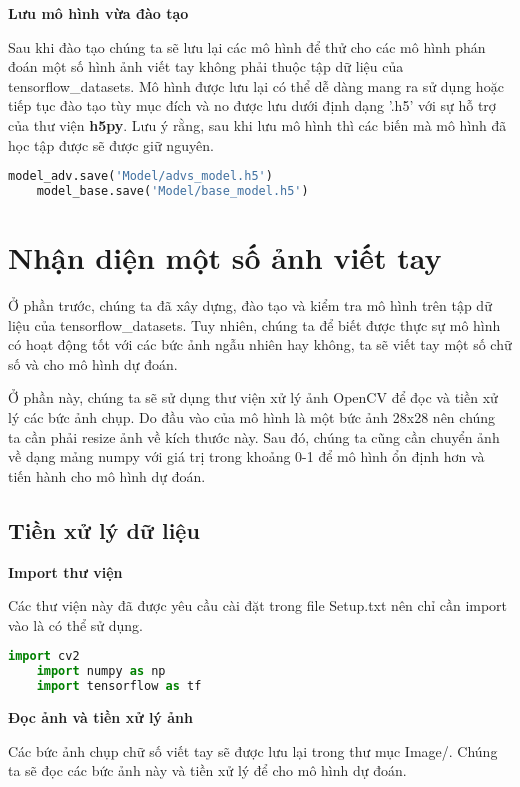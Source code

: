 \textbf{Lưu mô hình vừa đào tạo}

Sau khi đào tạo chúng ta sẽ lưu lại các mô hình để thử cho các mô hình phán đoán một số hình ảnh viết tay không phải thuộc tập dữ
liệu của tensorflow\_datasets. Mô hình được lưu lại có thể dễ dàng mang ra sử dụng hoặc tiếp tục đào tạo tùy mục đích và no được lưu dưới định dạng '.h5' với sự hỗ trợ của
thư viện \textbf{h5py}. Lưu ý rằng, sau khi lưu mô hình thì các biến mà mô hình đã học tập được sẽ được giữ nguyên.

\begin{lstlisting}[language = Python]
    model_adv.save('Model/advs_model.h5')
    model_base.save('Model/base_model.h5')
\end{lstlisting}

\cite*{WEBSITE}

\section{Nhận diện một số ảnh viết tay}

Ở phần trước, chúng ta đã xây dựng, đào tạo và kiểm tra mô hình trên tập dữ liệu của tensorflow\_datasets. Tuy nhiên, chúng ta 
để biết được thực sự mô hình có hoạt động tốt với các bức ảnh ngẫu nhiên hay không, ta sẽ viết tay một số chữ số và cho mô hình dự đoán.

Ở phần này, chúng ta sẽ sử dụng thư viện xử lý ảnh OpenCV để đọc và tiền xử lý các bức ảnh chụp. Do đầu vào của mô hình là một bức ảnh 28x28
nên chúng ta cần phải resize ảnh về kích thước này. Sau đó, chúng ta cũng cần chuyển ảnh về dạng mảng numpy với giá trị trong khoảng 0-1 để mô hình ổn định hơn và 
tiến hành cho mô hình dự đoán.

\subsection{Tiền xử lý dữ liệu}
\textbf{Import thư viện}

Các thư viện này đã được yêu cầu cài đặt trong file Setup.txt nên chỉ cần import vào là có thể sử dụng.
\begin{lstlisting}[language = Python]
    import cv2
    import numpy as np
    import tensorflow as tf
\end{lstlisting}

\textbf{Đọc ảnh và tiền xử lý ảnh}

Các bức ảnh chụp chữ số viết tay sẽ được lưu lại trong thư mục Image/. Chúng ta sẽ đọc các bức ảnh này và tiền xử lý để cho mô hình dự đoán.

